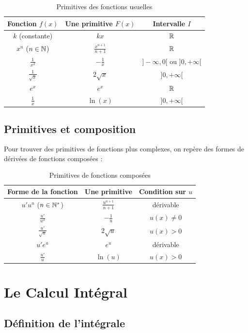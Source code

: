 \begin{table}[h!]
\centering
\begin{tabular}{|c|c|c|}
\hline
\textbf{Fonction} $f(x)$ & \textbf{Une primitive} $F(x)$ & \textbf{Intervalle} $I$ \\
\hline
$k$ (constante) & $kx$ & $\mathbb{R}$ \\
$x^n$ ($n \in \mathbb{N}$) & $\frac{x^{n+1}}{n+1}$ & $\mathbb{R}$ \\
$\frac{1}{x^2}$ & $-\frac{1}{x}$ & $]-\infty, 0[$ ou $]0, +\infty[$ \\
$\frac{1}{\sqrt{x}}$ & $2\sqrt{x}$ & $]0, +\infty[$ \\
$e^x$ & $e^x$ & $\mathbb{R}$ \\
$\frac{1}{x}$ & $\ln(x)$ & $]0, +\infty[$ \\
\hline
\end{tabular}
\caption{Primitives des fonctions usuelles}
\end{table}

\subsection{Primitives et composition}

Pour trouver des primitives de fonctions plus complexes, on repère des formes de dérivées de fonctions composées :

\begin{table}[h!]
\centering
\begin{tabular}{|c|c|c|}
\hline
\textbf{Forme de la fonction} & \textbf{Une primitive} & \textbf{Condition sur} $u$ \\
\hline
$u' u^n$ ($n \in \mathbb{N}^*$) & $\frac{u^{n+1}}{n+1}$ & dérivable \\
$\frac{u'}{u^2}$ & $-\frac{1}{u}$ & $u(x) \ne 0$ \\
$\frac{u'}{\sqrt{u}}$ & $2\sqrt{u}$ & $u(x) > 0$ \\
$u' e^u$ & $e^u$ & dérivable \\
$\frac{u'}{u}$ & $\ln(u)$ & $u(x) > 0$ \\
\hline
\end{tabular}
\caption{Primitives de fonctions composées}
\end{table}

\section{Le Calcul Intégral}

\subsection{Définition de l'intégrale}

